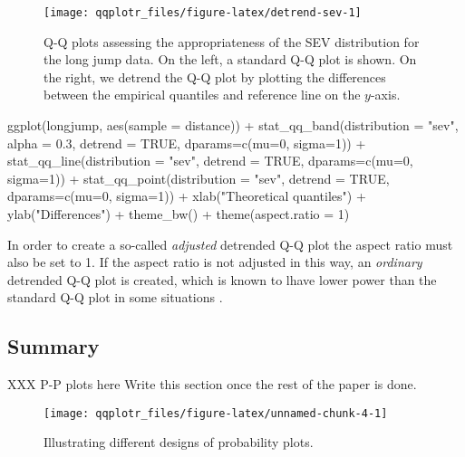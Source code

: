 \begin{Schunk}
\begin{figure}

{\centering \texttt{[image: qqplotr\_files/figure-latex/detrend-sev-1]} 

}

\caption[Q-Q plots assessing the appropriateness of the SEV distribution for the long jump data]{Q-Q plots assessing the appropriateness of the SEV distribution for the long jump data. On the left, a standard Q-Q plot is shown. On the right, we detrend the Q-Q plot by plotting the differences between the empirical quantiles and reference line on the $y$-axis.}\label{fig:detrend-sev}
\end{figure}
\end{Schunk}

\begin{Schunk}
\begin{Sinput}
ggplot(longjump, aes(sample = distance)) +
  stat_qq_band(distribution = "sev", alpha = 0.3, 
               detrend = TRUE, dparams=c(mu=0, sigma=1)) +
  stat_qq_line(distribution = "sev", 
               detrend = TRUE, dparams=c(mu=0, sigma=1)) +
  stat_qq_point(distribution = "sev", 
                detrend = TRUE, dparams=c(mu=0, sigma=1)) +
  xlab("Theoretical quantiles") +
  ylab("Differences") +
  theme_bw() +
  theme(aspect.ratio = 1)
\end{Sinput}
\end{Schunk}

In order to create a so-called \emph{adjusted} detrended Q-Q plot
\citep{Loy2016-fg} the aspect ratio must also be set to 1. If the aspect
ratio is not adjusted in this way, an \emph{ordinary} detrended Q-Q plot
is created, which is known to lhave lower power than the standard Q-Q
plot in some situations \citep{Loy2016-fg}.

\subsection{Summary}\label{summary}

XXX P-P plots here Write this section once the rest of the paper is
done.

\begin{Schunk}
\begin{figure}

{\centering \texttt{[image: qqplotr\_files/figure-latex/unnamed-chunk-4-1]} 

}

\caption{\label{fig:pp-designs}Illustrating different designs of probability plots.}\label{fig:unnamed-chunk-4}
\end{figure}
\end{Schunk}

